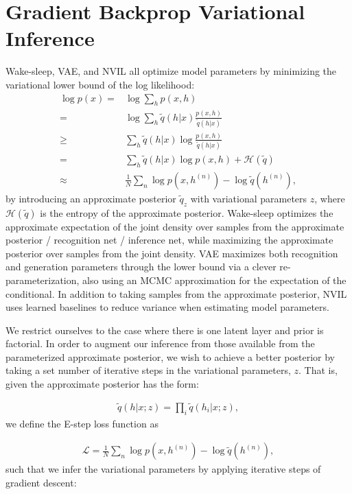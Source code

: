 \documentclass[preprint, twocolumn]{article}
\newcommand{\LL}[0]{\mathcal{L}}
\newcommand{\HH}[0]{\mathcal{H}}
\begin{document}
\section{Gradient Backprop Variational Inference}
Wake-sleep, VAE, and NVIL all optimize model parameters by minimizing the variational lower bound of the log likelihood:
\begin{align}
    \label{eq:approx_logp}
    \log p(x) =& \log \sum_{h} p(x, h) \nonumber \\
    =& \log \sum_h \tilde{q}(h|x) \frac{p(x, h)}{\tilde{q}(h|x)} \nonumber \\
    \geq& \sum_h \tilde{q}(h|x) \log \frac{p(x, h)}{\tilde{q}(h|x)} \nonumber \\
    =& \sum_h \tilde{q}(h|x) \log p(x,h) + \HH(\tilde{q}) \nonumber \\
    \approx& \frac{1}{N} \sum_n \log p(x, h^{(n)}) - \log
    \tilde{q}(h^{(n)}),
\end{align}
by introducing an approximate posterior $\tilde{q}_z$ with variational parameters $z$, where $\HH(\tilde{q})$ is the entropy of the approximate posterior.  Wake-sleep optimizes the approximate expectation of the joint density over samples from the approximate posterior / recognition net / inference net, while maximizing the approximate posterior over samples from the joint density. VAE maximizes both recognition and generation parameters through the lower bound via a clever re-parameterization, also using an MCMC approximation for the expectation of the conditional. In addition to taking samples from the approximate posterior, NVIL uses learned baselines to reduce variance when estimating model parameters.

We restrict ourselves to the case where there is one latent layer and prior is factorial. In order to augment our inference from those available from the parameterized approximate posterior, we wish to achieve a better posterior by taking a set number of iterative steps in the variational parameters, $z$. That is, given the approximate posterior has the form:

\begin{align}
\tilde{q}(h|x; z) = \prod_i \tilde{q}(h_i|x; z),
\end{align}
we define the E-step loss function as

\begin{align}
\LL = \frac{1}{N} \sum_n \log p(x, h^{(n)}) - \log \tilde{q}(h^{(n)}),
\end{align}
such that we infer the variational parameters by applying iterative steps of gradient descent:
\end{document}
